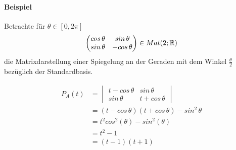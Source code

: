 \paragraph{Beispiel}
Betrachte für $\theta \in [0, 2\pi]$
\begin{align}
\begin{pmatrix} cos\, \theta & sin\, \theta \\ sin\, \theta & -cos\, \theta\end{pmatrix} \in Mat(2;\mathbb{R})
\end{align}
die Matrixdarstellung einer Spiegelung an der Geraden mit dem Winkel $\frac{\theta}{2}$ bezüglich der Standardbasis.

\begin{align}
P_A(t) &= \begin{vmatrix} t-cos\, \theta & sin\, \theta \\ sin\, \theta & t+cos\, \theta\end{vmatrix} \\
&= (t - cos\, \theta)(t + cos\, \theta) - sin^2 \, \theta \\
&= t^2  cos^2(\theta) - sin^2(\theta) \\
&= t^2 - 1 \\
&= (t-1)(t+1)
\end{align}

